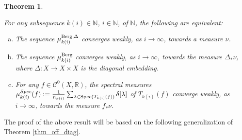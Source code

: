 \documentclass[12pt]{article}
\numberwithin{equation}{section}
\theoremstyle{theorem}
\newtheorem{thm}{Theorem}[section]
\theoremstyle{definition}
\theoremstyle{remark}
\newcommand{\real}{\mathbb{R}}
\newcommand{\nat}{\mathbb{N}}
\newcommand{\ccal}{\mathscr{C}}
\begin{document}
	\begin{thm}\label{thm_equil_equidist}
	\begin{sloppypar}
		For any subsequence $k(i) \in \nat$, $i \in \nat$, of $\nat$, the following are equivalent:
		\begin{enumerate}[a)]
			\item
			The sequence $\mu_{k(i)}^{\rm{Berg}, \Delta}$ converges weakly, as $i \to \infty$, towards a measure $\nu$.
			\item
			The sequence $\mu_{k(i)}^{\rm{Berg}}$ converges weakly, as $i \to \infty$, towards the measure $\Delta_* \nu$, where $\Delta: X \to X \times X$ is the diagonal embedding.
			\item
			For any $f \in \ccal^0(X, \real)$, the spectral measures $\mu_{k(i)}^{Spec}(f) := \frac{1}{n_{k(i)}} \sum_{\lambda \in {\rm{Spec}} (T_{k(i)}(f))} \delta[\lambda]$ of $T_{k(i)}(f)$ converge weakly, as $i \to \infty$, towards the measure $f_* \nu$.
		\end{enumerate}
	\end{sloppypar}
	\end{thm}
	The proof of the above result will be based on the following generalization of Theorem \ref{thm_off_diag}.
	
\end{document}

